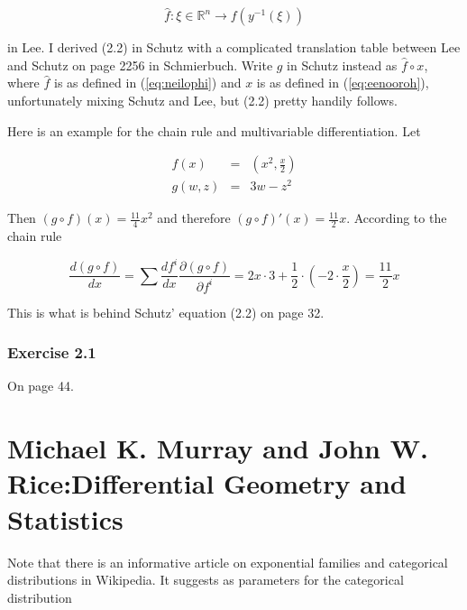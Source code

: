 \documentclass[12pt]{article}
\begin{document}
\begin{equation}
  \label{eq:neilophi}
  \hat{f}:\xi\in\mathbb{R}^{n}\rightarrow{}f(y^{-1}(\xi))
\end{equation}

in Lee. I derived (2.2) in Schutz with a complicated translation table
between Lee and Schutz on page 2256 in Schmierbuch. Write $g$ in
Schutz instead as $\hat{f}\circ{}x$, where $\hat{f}$ is as defined in
(\ref{eq:neilophi}) and $x$ is as defined in (\ref{eq:eenooroh}),
unfortunately mixing Schutz and Lee, but (2.2) pretty handily follows.

Here is an example for the chain rule and multivariable
differentiation. Let

\begin{equation}
  \label{eq:eengoogu}
  \begin{array}{rcl}
    f(x)&=&\left(x^{2},\frac{x}{2}\right) \\
    g(w,z)&=&3w-z^{2}
  \end{array}
\end{equation}

Then $(g\circ{}f)(x)=\frac{11}{4}x^{2}$ and therefore
$(g\circ{}f)'(x)=\frac{11}{2}x$. According to the chain rule

\begin{equation}
  \label{eq:ahhoiqua}
  \frac{d(g\circ{}f)}{dx}=\sum\frac{df^{i}}{dx}\frac{\partial(g\circ{}f)}{\partial{}f^{i}}=2x\cdot{}3+\frac{1}{2}\cdot\left(-2\cdot\frac{x}{2}\right)=\frac{11}{2}x
\end{equation}

This is what is behind Schutz' equation (2.2) on page 32.

\subsubsection{Exercise 2.1}
\label{subsubsection:veecheic}

On page 44.

\section{Michael K. Murray and John W. Rice:\newline Differential Geometry and
Statistics}
\label{murrayrice}

Note that there is an informative article on exponential families and
categorical distributions in Wikipedia. It suggests as parameters for
the categorical distribution
\end{document}
